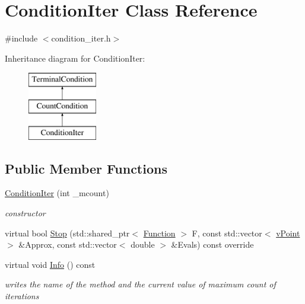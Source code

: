 \hypertarget{class_condition_iter}{}\section{Condition\+Iter Class Reference}
\label{class_condition_iter}


{\ttfamily \#include $<$condition\+\_\+iter.\+h$>$}

Inheritance diagram for Condition\+Iter\+:\begin{figure}[H]
\begin{center}
\leavevmode
\includegraphics[height=3.000000cm]{class_condition_iter}
\end{center}
\end{figure}
\subsection*{Public Member Functions}
\begin{DoxyCompactItemize}
\item 
\mbox{\label{class_condition_iter_a062d71109b94174f2efa1bab3fb0701d}} 
\hyperlink{class_condition_iter_a062d71109b94174f2efa1bab3fb0701d}{Condition\+Iter} (int \+\_\+mcount)
\begin{DoxyCompactList}\small\item\em constructor \end{DoxyCompactList}\item 
virtual bool \hyperlink{class_condition_iter_af9de25d536e5a9af7bd711e569356533}{Stop} (std\+::shared\+\_\+ptr$<$ \hyperlink{class_function}{Function} $>$ F, const std\+::vector$<$ \hyperlink{classv_point}{v\+Point} $>$ \&Approx, const std\+::vector$<$ double $>$ \&Evals) const override
\item 
\mbox{\label{class_condition_iter_acc2c4303cd4bbc84abb9619af2f74e5c}} 
virtual void \hyperlink{class_condition_iter_acc2c4303cd4bbc84abb9619af2f74e5c}{Info} () const
\begin{DoxyCompactList}\small\item\em writes the name of the method and the current value of maximum count of iterations \end{DoxyCompactList}\end{DoxyCompactItemize}


